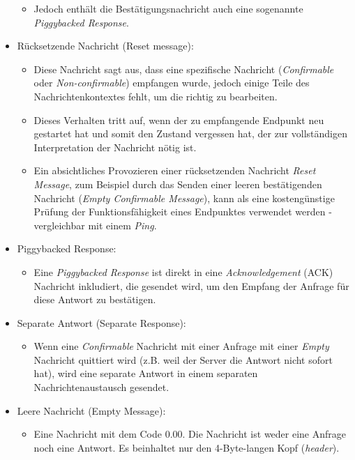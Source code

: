 \begin{itemize}
\begin{itemize}
        \item Jedoch enthält die Bestätigungsnachricht auch eine sogenannte \textit{Piggybacked Response}.
    \end{itemize}
    \item Rücksetzende Nachricht (Reset message):
    \begin{itemize}
        \item Diese Nachricht sagt aus, dass eine spezifische Nachricht (\textit{Confirmable} oder \textit{Non-confirmable}) empfangen wurde, jedoch einige Teile des Nachrichtenkontextes fehlt, um die richtig zu bearbeiten.
        \item Dieses Verhalten tritt auf, wenn der zu empfangende Endpunkt neu gestartet hat und somit den Zustand vergessen hat, der zur vollständigen Interpretation der Nachricht nötig ist.
        \item Ein absichtliches Provozieren einer rücksetzenden Nachricht \textit{Reset Message}, zum Beispiel durch das Senden einer leeren bestätigenden Nachricht (\textit{Empty Confirmable Message}), kann als eine kostengünstige Prüfung der Funktionsfähigkeit eines Endpunktes verwendet werden - vergleichbar mit einem \textit{Ping}.
    \end{itemize}
    \item Piggybacked Response:
    \begin{itemize}
        \item Eine \textit{Piggybacked Response} ist direkt in eine \textit{Acknowledgement} (ACK) Nachricht inkludiert, die gesendet wird, um den Empfang der Anfrage für diese Antwort zu bestätigen.
    \end{itemize}
    \item Separate Antwort (Separate Response):
    \begin{itemize}
        \item Wenn eine \textit{Confirmable} Nachricht mit einer Anfrage mit einer \textit{Empty} Nachricht quittiert wird (z.B. weil der Server die Antwort nicht sofort hat), wird eine separate Antwort in einem separaten Nachrichtenaustausch gesendet.
    \end{itemize}
    \item Leere Nachricht (Empty Message):
    \begin{itemize}
        \item Eine Nachricht mit dem Code 0.00. Die Nachricht ist weder eine Anfrage noch eine Antwort. Es beinhaltet nur den 4-Byte-langen Kopf (\textit{header}).
    \end{itemize}
\end{itemize}

